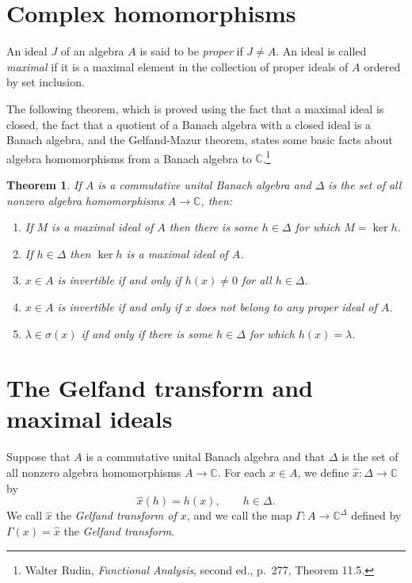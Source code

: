 \documentclass{article}
\newtheorem{theorem}{Theorem}
\theoremstyle{definition}
\begin{document}
\section{Complex homomorphisms}
An ideal $J$ of an algebra $A$ is said to be {\em proper} if $J \neq A$. An ideal is called {\em maximal} if it is a maximal element
in the collection of proper ideals of $A$ ordered by set inclusion.

The following theorem, which is proved using the fact  that a maximal
ideal is closed, the fact that a quotient of a Banach algebra with a closed ideal is a Banach algebra, and the Gelfand-Mazur theorem, states some basic facts about algebra
homomorphisms from a Banach algebra to $\mathbb{C}$.\footnote{Walter Rudin, {\em Functional Analysis}, second ed.,
p.~277, Theorem 11.5.}

\begin{theorem}
If $A$ is a commutative unital Banach algebra and $\Delta$ is the set of all nonzero
algebra homomorphisms $A \to \mathbb{C}$, then:
\begin{enumerate}
\item If $M$ is a maximal ideal of $A$ then there is some $h \in \Delta$ for which $M=\ker h$.
\item If $h \in \Delta$ then $\ker h$ is a maximal ideal of $A$.
\item $x \in A$ is invertible if and only if  $h(x) \neq 0$ for all $h \in \Delta$.
\item $x \in A$ is invertible if and only if $x$ does not belong to any proper ideal of $A$.
\item  $\lambda \in \sigma(x)$ if and only if there is some $h \in \Delta$ for which $h(x)=\lambda$.
\end{enumerate}
\label{homotheorem}
\end{theorem} 



\section{The Gelfand transform and maximal ideals}
Suppose that $A$ is a commutative unital Banach algebra and that $\Delta$ is the set of all nonzero algebra homomorphisms $A \to \mathbb{C}$. 
For each $x \in A$, we define $\hat{x}:\Delta \to \mathbb{C}$ by
\[
\hat{x}(h)=h(x), \qquad h \in \Delta.
\]
We call $\hat{x}$ the {\em Gelfand transform of $x$}, and
we call the map $\Gamma:A \to \mathbb{C}^\Delta$ defined by $\Gamma(x) = \hat{x}$ the {\em Gelfand transform}.
\end{document}

